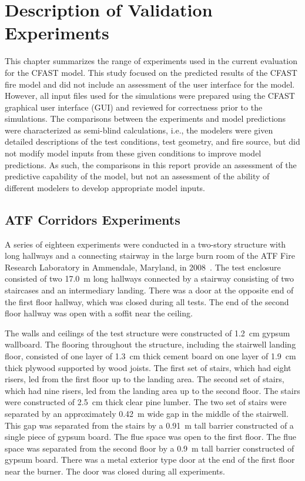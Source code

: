 \chapter{Description of Validation Experiments}

\label{Experiment_Chapter}

This chapter summarizes the range of experiments used in the current evaluation for the CFAST model. This study focused on the predicted results of the CFAST fire model and did not include an assessment of the user interface for the model.  However, all input files used for the simulations were prepared using the CFAST graphical user interface (GUI) and reviewed for correctness prior to the simulations.  The comparisons between the experiments and model predictions were characterized as semi-blind calculations, i.e., the modelers were given detailed descriptions of the test conditions, test geometry, and fire source, but did not modify model inputs from these given conditions to improve model predictions.  As such, the comparisons in this report provide an assessment of the predictive capability of the model, but not an assessment of the ability of different modelers to develop appropriate model inputs.

\section{ATF Corridors Experiments}

A series of eighteen experiments were conducted in a two-story structure with long hallways and a connecting stairway
in the large burn room of the ATF Fire Research Laboratory in Ammendale, Maryland, in 2008~\cite{Sheppard:Corridors}.
The test enclosure consisted of two 17.0~m long hallways connected by a
stairway consisting of two staircases and an intermediary landing.
There was a door at the opposite end of the first floor hallway, which was closed during all tests.
The end of the second floor hallway was open with a soffit near the ceiling.

The walls and ceilings of the test structure were constructed of 1.2~cm gypsum wallboard.
The flooring throughout the structure, including the stairwell landing floor, consisted of one layer of 1.3~cm thick cement board on one
layer of 1.9~cm thick plywood supported by wood joists. The first set of stairs, which had eight risers, led from the first floor up to the landing area.
The second set of stairs, which had nine risers, led from the landing area up to the second floor.
The stairs were constructed of 2.5~cm thick clear pine lumber. The two set of stairs were separated by an approximately 0.42~m wide gap in the middle of the stairwell.
This gap was separated from the stairs by a 0.91~m tall barrier constructed of a single piece of gypsum board.
The flue space was open to the first floor.  The flue space was separated from the second floor by a 0.9~m tall barrier constructed of gypsum board.
There was a metal exterior type door at the end of the first floor near the burner.  The door was closed during all experiments.


